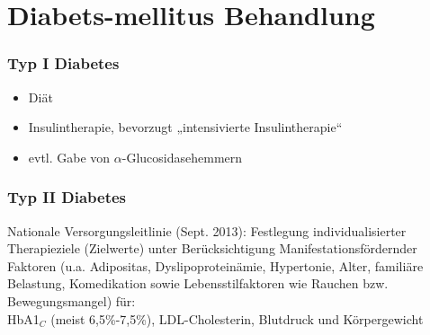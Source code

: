 \documentclass[10pt,a4paper]{report}
\begin{document}
\section{Diabets-mellitus Behandlung} %
\label{sec:diabets_mellitus_behandlung}
\subsubsection{Typ I Diabetes} %
\label{ssub:typ_i_diabetes}
\begin{itemize}
	\item Diät
	\item Insulintherapie, bevorzugt „intensivierte Insulintherapie“
	\item evtl. Gabe von $\alpha$-Glucosidasehemmern
\end{itemize}
\subsubsection{Typ II Diabetes} %
\label{ssub:typ_ii_diabetes}
Nationale Versorgungsleitlinie (Sept. 2013): Festlegung individualisierter Therapieziele (Zielwerte) unter Berücksichtigung Manifestationsfördernder Faktoren (u.a. Adipositas, Dyslipoproteinämie, Hypertonie, Alter, familiäre Belastung, Komedikation sowie Lebensstilfaktoren wie Rauchen bzw. Bewegungsmangel) für:\\
HbA1$_C$ (meist 6,5\%-7,5\%), LDL-Cholesterin, Blutdruck und Körpergewicht 
\end{document}
